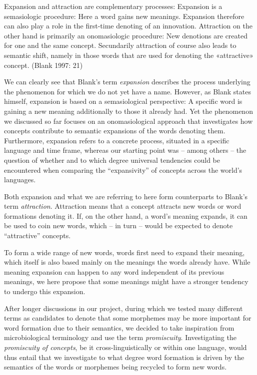 \documentclass[
  english,
  a4paper,
  oneside,tablecaptionabove
]{scrbook}
\begin{document}
\begin{displayquote}
Expansion and attraction are complementary processes: Expansion is a
semasiologic procedure: Here a word gains new meanings. Expansion
therefore can also play a role in the first-time denoting of an
innovation. Attraction on the other hand is primarily an onomasiologic
procedure: New denotions are created for one and the same concept.
Secundarily attraction of course also leads to semantic shift, namely in
those words that are used for denoting the «attractive» concept. (Blank
1997: 21)
\end{displayquote}

We can clearly see that Blank's term \emph{expansion} describes the
process underlying the phenomenon for which we do not yet have a name.
However, as Blank states himself, expansion is based on a semasiological
perspective: A specific word is gaining a new meaning additionally to
those it already had. Yet the phenomenon we discussed so far focuses on
an onomasiological approach that investigates how concepts contribute to
semantic expansions of the words denoting them. Furthermore, expansion
refers to a concrete process, situated in a specific language and time
frame, whereas our starting point was -- among others -- the question of
whether and to which degree universal tendencies could be encountered
when comparing the \enquote{expansivity} of concepts across the world's
languages.

Both expansion and what we are referring to here form counterparts to
Blank's term \emph{attraction}. Attraction means that a concept
attracts new words or word formations denoting it. If, on the other
hand, a word's meaning expands, it can be used to coin new words, which
-- in turn -- would be expected to denote \enquote{attractive} concepts.

To form a wide range of new words, words first need to expand their
meaning, which itself is also based mainly on the meanings the words
already have. While meaning expansion can happen to any word independent
of its previous meanings, we here propose that some meanings might have
a stronger tendency to undergo this expansion.

After longer discussions in our project, during which we tested many
different terms as candidates to denote that some morphemes may be more
important for word formation due to their semantics, we decided to take
inspiration from microbiological terminology and use the term
\emph{promiscuity}. Investigating the \emph{promiscuity of concepts},
be it cross-linguistically or within one language, would thus entail
that we investigate to what degree word formation is driven by the
semantics of the words or morphemes being recycled to form new words.
\end{document}
